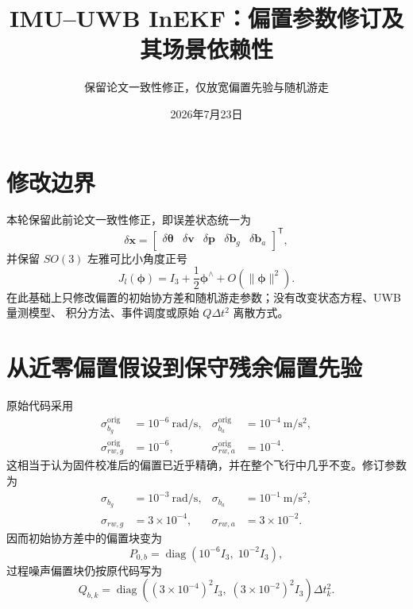 \documentclass[11pt,a4paper]{ctexart}
\title{IMU--UWB InEKF：偏置参数修订及其场景依赖性}
\author{保留论文一致性修正，仅放宽偏置先验与随机游走}
\date{2026年7月23日}
\begin{document}
\maketitle

\section{修改边界}

本轮保留此前论文一致性修正，即误差状态统一为
\begin{equation}
 \delta\bm x =
 \begin{bmatrix}
 \delta\bm\theta&
 \delta\bm v&
 \delta\bm p&
 \delta\bm b_g&
 \delta\bm b_a
 \end{bmatrix}^{\mathsf T},
\end{equation}
并保留 $SO(3)$ 左雅可比小角度正号
\begin{equation}
 J_l(\bm\phi)=I_3+\frac{1}{2}\bm\phi^\wedge
 +O(\lVert\bm\phi\rVert^2).
\end{equation}
在此基础上只修改偏置的初始协方差和随机游走参数；没有改变状态方程、UWB 量测模型、
积分方法、事件调度或原始 $Q\Delta t^2$ 离散方式。

\section{从近零偏置假设到保守残余偏置先验}

原始代码采用
\begin{align}
 \sigma_{b_g}^{\mathrm{orig}} &= 10^{-6}\ \mathrm{rad/s},&
 \sigma_{b_a}^{\mathrm{orig}} &= 10^{-4}\ \mathrm{m/s^2},\\
 \sigma_{rw,g}^{\mathrm{orig}} &= 10^{-6},&
 \sigma_{rw,a}^{\mathrm{orig}} &= 10^{-4}.
\end{align}
这相当于认为固件校准后的偏置已近乎精确，并在整个飞行中几乎不变。修订参数为
\begin{align}
 \sigma_{b_g} &= 10^{-3}\ \mathrm{rad/s},&
 \sigma_{b_a} &= 10^{-1}\ \mathrm{m/s^2},\\
 \sigma_{rw,g} &= 3\times10^{-4},&
 \sigma_{rw,a} &= 3\times10^{-2}.
\end{align}
因而初始协方差中的偏置块变为
\begin{equation}
 P_{0,b}=
 \operatorname{diag}\left(
 10^{-6}I_3,\;10^{-2}I_3
 \right),
\end{equation}
过程噪声偏置块仍按原代码写为
\begin{equation}
 Q_{b,k}=
 \operatorname{diag}\left(
 (3\times10^{-4})^2I_3,\;(3\times10^{-2})^2I_3
 \right)\Delta t_k^2.
\end{equation}
\end{document}
